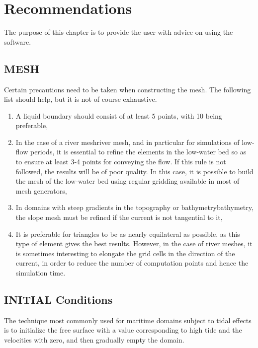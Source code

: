 




\chapter{  Recommendations}

 The purpose of this chapter is to provide the user with advice on using the software.


\section{ MESH}

 Certain precautions need to be taken when constructing the mesh. The following list should help, but it is not of course exhaustive.

\begin{enumerate}
\item  A liquid boundary should consist of at least 5 points, with 10 being preferable,

\item  In the case of a river meshriver mesh, and in particular for simulations of low-flow periods, it is essential to refine the elements in the low-water bed so as to ensure at least 3-4 points for conveying the flow. If this rule is not followed, the results will be of poor quality. In this case, it is possible to build the mesh of the low-water bed using regular gridding available in most of mesh generators,

\item  In domains with steep gradients in the topography or bathymetrybathymetry, the slope mesh must be refined if the current is not tangential to it,

\item  It is preferable for triangles to be as nearly equilateral as possible, as this type of element gives the best results. However, in the case of river meshes, it is sometimes interesting to elongate the grid cells in the direction of the current, in order to reduce the number of computation points and hence the simulation time.
\end{enumerate}


\section{ INITIAL Conditions}

 The technique most commonly used for maritime domains subject to tidal effects is to initialize the free surface with a value corresponding to high tide and the velocities with zero, and then gradually empty the domain.

